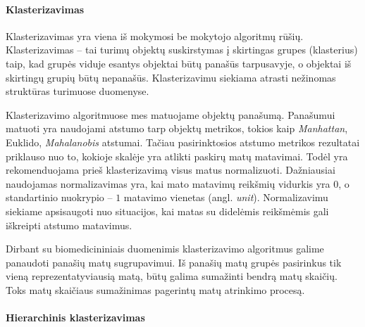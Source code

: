 

\paragraph{Klasterizavimas}

Klasterizavimas yra viena iš mokymosi be mokytojo algoritmų rūšių. Klasterizavimas -- tai turimų objektų suskirstymas į skirtingas grupes (klasterius) taip, kad grupės viduje esantys objektai būtų panašūs tarpusavyje, o objektai iš skirtingų grupių būtų nepanašūs. Klasterizavimu siekiama atrasti nežinomas struktūras turimuose duomenyse. 

Klasterizavimo algoritmuose mes matuojame objektų panašumą. Panašumui matuoti yra naudojami atstumo tarp objektų metrikos, tokios kaip \textit{Manhattan}, Euklido, \textit{Mahalanobis} atstumai. Tačiau pasirinktosios atstumo metrikos rezultatai priklauso nuo to, kokioje skalėje yra atlikti paskirų matų matavimai. Todėl yra rekomenduojama prieš klasterizavimą visus matus normalizuoti. Dažniausiai naudojamas normalizavimas yra, kai mato matavimų reikšmių vidurkis yra $0$, o standartinio nuokrypio -- $1$ matavimo vienetas (angl. \textit{unit}). Normalizavimu siekiame apsisaugoti nuo situacijos, kai matas su didelėmis reikšmėmis gali iškreipti atstumo matavimus. 

Dirbant su biomedicininiais duomenimis klasterizavimo algoritmus galime panaudoti panašių matų sugrupavimui. Iš panašių matų grupės pasirinkus tik vieną reprezentatyviausią matą, būtų galima sumažinti bendrą matų skaičių. Toks matų skaičiaus sumažinimas pagerintų matų atrinkimo procesą.

\paragraph{Hierarchinis klasterizavimas}


